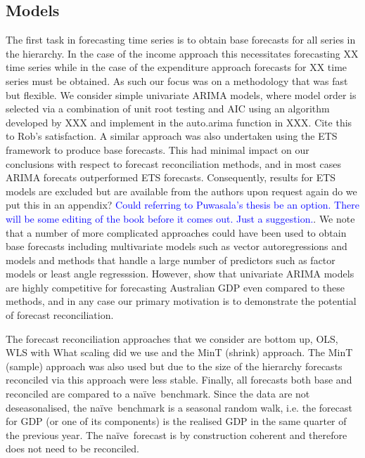 \documentclass[graybox]{svmult}
\def\naive{na\"{i}ve\ }
\begin{document}
\subsection{Models}

The first task in forecasting time series is to obtain base forecasts for all series in the hierarchy.  In the case of the income approach this necessitates forecasting XX time series while in the case of the expenditure approach forecasts for XX time series must be obtained.  As such our focus was on a methodology that was fast but flexible.  We consider simple univariate ARIMA models, where model order is selected via a combination of unit root testing and AIC using an algorithm developed by XXX and implement in the auto.arima function in XXX. {\color{red} Cite this to Rob's satisfaction}.  A similar approach was also undertaken using the ETS framework to produce base forecasts.  This had minimal impact on our conclusions with respect to forecast reconciliation methods, and in most cases ARIMA forecats outperformed ETS forecasts.  Consequently, results for ETS models are excluded but are available from the authors upon request {\color{red} again do we put this in an appendix?} \textcolor{blue}{Could referring to Puwasala's thesis be an option. There will be some editing of the book before it comes out. Just a suggestion.}.  We note that a number of more complicated approaches could have been used to obtain base forecasts including multivariate models such as vector autoregressions and models and methods that handle a large number of predictors such as factor models or least angle regresssion.  However, \cite{PanEtAl2019} show that univariate ARIMA models are highly competitive for forecasting Australian GDP even compared to these methods, and in any case our primary motivation is to demonstrate the potential of forecast reconciliation.

The forecast reconciliation approaches that we consider are bottom up, OLS, WLS with {\color{red} What scaling did we use} and the MinT (shrink) approach.  The MinT (sample) approach was also used but due to the size of the hierarchy forecasts reconciled via this approach were less stable.  Finally, all forecasts both base and reconciled are compared to a \naive benchmark.  Since the data are not deseasonalised, the \naive benchmark is a seasonal random walk, i.e. the forecast for GDP (or one of its components) is the realised GDP in the same quarter of the previous year.  The \naive forecast is by construction coherent and therefore does not need to be reconciled.
\end{document}
